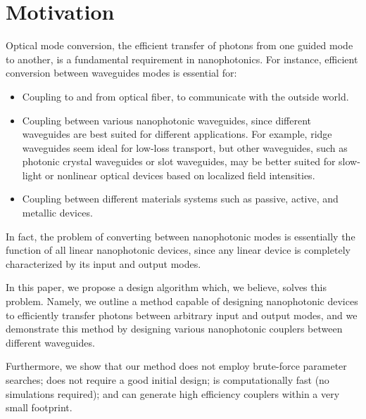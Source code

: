 \documentclass[letterpaper,10pt]{article}
\begin{document}
\section{Motivation}

Optical mode conversion, 
    the efficient transfer of photons from one guided mode to another,
    is a fundamental requirement in nanophotonics.
For instance, efficient conversion between waveguides modes
    is essential for:
    \begin{itemize}
        \item Coupling to and from optical fiber\cite{fibergrating}, 
        to communicate with the outside world.
    \item Coupling between various nanophotonic waveguides, 
        since different waveguides are best suited for different applications.
        For example, ridge waveguides seem ideal for 
            low-loss transport\cite{ridge},
            but other waveguides, 
            such as photonic crystal waveguides or slot waveguides,
            may be better suited for slow-light\cite{pcslow} 
            or nonlinear optical devices based on 
            localized field intensities\cite{slotfocus}.
    \item Coupling between different materials systems such as
       passive, active\cite{active}, and metallic\cite{metallic} devices. 
    \end{itemize}
In fact, the problem of converting between nanophotonic modes is essentially
    the function of all linear nanophotonic devices, since
    any linear device is completely characterized by its input and output modes.

In this paper, we propose a design algorithm which, 
    we believe, solves this problem.
Namely, we outline a method capable of designing nanophotonic devices
    to efficiently transfer photons between 
    arbitrary input and output modes,
    and we demonstrate this method by designing various nanophotonic couplers
    between different waveguides.

Furthermore, we show that our method 
     does not employ brute-force parameter searches;
     does not require a good initial design;
     is computationally fast (no simulations required);
     and can generate high efficiency couplers within a very small footprint. 
% 
% 
% 
\end{document}
